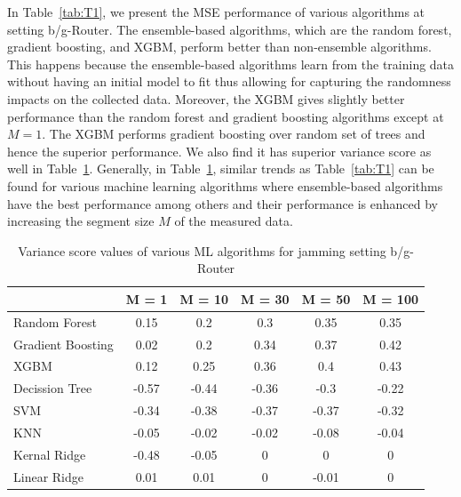    In Table~\ref{tab:T1}, we present the MSE performance of various algorithms at setting b/g-Router. The ensemble-based algorithms, which are the random forest, gradient boosting, and XGBM, perform better than non-ensemble algorithms. This happens because the ensemble-based algorithms learn from the training data without having an initial model to fit thus allowing for capturing the randomness impacts on the collected data. Moreover, the XGBM gives slightly better performance than the random forest and gradient boosting algorithms except at $M=1$. The XGBM performs gradient boosting over random set of trees and hence the superior performance. We also find it has superior variance score as well in Table~\ref{tab:T2}. Generally, in Table~\ref{tab:T2}, similar trends as Table~\ref{tab:T1} can be found for various machine learning algorithms where ensemble-based algorithms have the best performance among others and their performance is enhanced by increasing the segment size $M$ of the measured data.
    
\begin{table}[htbp]
  \centering
  \caption{Variance score values of various ML algorithms for jamming setting b/g-Router}
    \begin{tabular}{|p{5.3em}|c|c|c|c|c|}
    \toprule
          & \multicolumn{1}{p{2.4em}|}{M = 1} & \multicolumn{1}{p{2.9em}|}{M = 10} & \multicolumn{1}{p{2.9em}|}{M = 30} & \multicolumn{1}{p{2.9em}|}{M = 50} & \multicolumn{1}{p{3.4em}|}{M = 100} \\
    \midrule
    Random Forest	 & 0.15  & 0.2   & 0.3   & 0.35  & 0.35 \\
    \midrule
    Gradient Boosting  & 0.02  & 0.2   & 0.34  & 0.37  & 0.42 \\
    \midrule
    XGBM  & 0.12  & 0.25  & 0.36  & 0.4   & 0.43 \\
    \midrule
    Decission Tree & -0.57 & -0.44 & -0.36 & -0.3  & -0.22 \\
    \midrule
    SVM   & -0.34 & -0.38 & -0.37 & -0.37 & -0.32 \\
    \midrule
    KNN   & -0.05 & -0.02 & -0.02 & -0.08 & -0.04 \\
    \midrule
    Kernal Ridge & -0.48 & -0.05 & 0     & 0     & 0 \\
    \midrule
    Linear Ridge & 0.01  & 0.01  & 0     & -0.01 & 0 \\
    \bottomrule
    \end{tabular}%
  \label{tab:T2}%
\end{table}%


